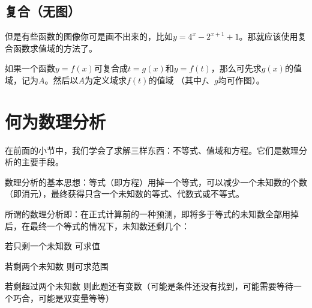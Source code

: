 \subsection[复合]{复合（无图）}
但是有些函数的图像你可是画不出来的，比如$y=4^x-2^{x+1}+1$。那就应该使用复合函数求值域的方法了。

如果一个函数$y=f(x)$可复合成$t=g(x)$和$y=f(t)$，那么可先求$g(x)$的值域，记为$A$。然后以$A$为定义域求$f(t)$的值域
（其中$f$、$g$均可作图）。

\section{何为数理分析}
在前面的小节中，我们学会了求解三样东西：不等式、值域和方程。它们是数理分析的主要手段。

数理分析的基本思想：等式（即方程）用掉一个等式，可以减少一个未知数的个数（即消元），最终获得只含一个未知数的等式、代数式或不等式。

所谓的数理分析即：在正式计算前的一种预测，即将多于等式的未知数全部用掉后，在最终一个等式的情况下，未知数还剩几个：

\begin{desclist}
	\item[若只剩一个未知数] 可求值
	\item[若剩两个未知数] 则可求范围
	\item[若剩超过两个未知数] 则此题还有变数（可能是条件还没有找到，可能需要等待一个巧合，可能是双变量等等）
\end{desclist}

